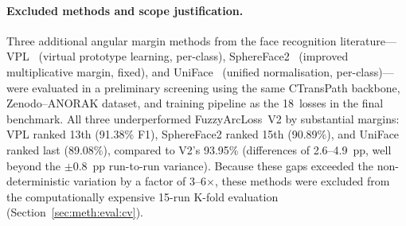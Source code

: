 \paragraph{Excluded methods and scope justification.}
Three additional angular margin methods from the face recognition
literature---VPL~\cite{deng2021vpl} (virtual prototype learning,
per-class), SphereFace2~\cite{wen2022sphereface2} (improved
multiplicative margin, fixed), and
UniFace~\cite{zhou2023uniface} (unified normalisation,
per-class)---were evaluated in a preliminary screening using the
same CTransPath backbone, Zenodo--ANORAK dataset, and training
pipeline as the 18~losses in the final benchmark.
All three underperformed FuzzyArcLoss~V2 by substantial margins:
VPL ranked 13th (91.38\% F1), SphereFace2 ranked 15th (90.89\%),
and UniFace ranked last (89.08\%), compared to V2's 93.95\%
(differences of 2.6--4.9~pp, well beyond the $\pm 0.8$~pp
run-to-run variance).
Because these gaps exceeded the non-deterministic variation by a
factor of 3--6$\times$, these methods were excluded from the
computationally expensive 15-run K-fold evaluation
(Section~\ref{sec:meth:eval:cv}).

